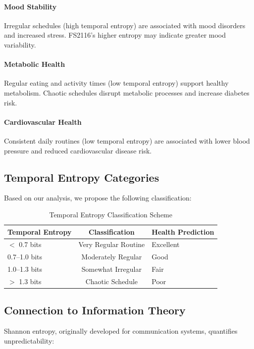 \documentclass[12pt]{article}
\begin{document}
\paragraph{Mood Stability}
Irregular schedules (high temporal entropy) are associated with mood disorders and increased stress. FS2116's higher entropy may indicate greater mood variability.

\paragraph{Metabolic Health}
Regular eating and activity times (low temporal entropy) support healthy metabolism. Chaotic schedules disrupt metabolic processes and increase diabetes risk.

\paragraph{Cardiovascular Health}
Consistent daily routines (low temporal entropy) are associated with lower blood pressure and reduced cardiovascular disease risk.

\subsection{Temporal Entropy Categories}

Based on our analysis, we propose the following classification:

\begin{table}[H]
\centering
\begin{tabular}{lcl}
\toprule
\textbf{Temporal Entropy} & \textbf{Classification} & \textbf{Health Prediction} \\
\midrule
$<$ 0.7 bits & Very Regular Routine & Excellent \\
0.7--1.0 bits & Moderately Regular & Good \\
1.0--1.3 bits & Somewhat Irregular & Fair \\
$>$ 1.3 bits & Chaotic Schedule & Poor \\
\bottomrule
\end{tabular}
\caption{Temporal Entropy Classification Scheme}
\end{table}

\subsection{Connection to Information Theory}

Shannon entropy, originally developed for communication systems, quantifies unpredictability:
\end{document}
